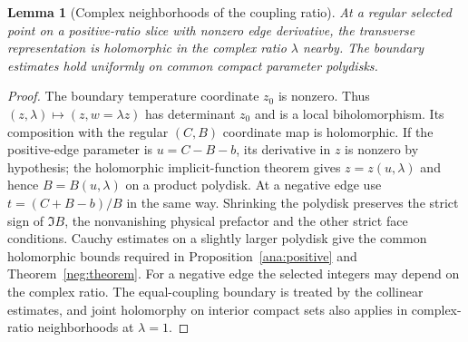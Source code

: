 \documentclass[11pt]{article}
\numberwithin{equation}{section}
\newtheorem{lemma}[theorem]{Lemma}
\theoremstyle{definition}
\begin{document}
\begin{lemma}[Complex neighborhoods of the coupling ratio]\label{main:complexratio}
At a regular selected point on a positive-ratio slice with nonzero
edge derivative, the transverse representation is holomorphic in
the complex ratio \(\lambda\) nearby. The boundary estimates hold
uniformly on common compact parameter polydisks.
\end{lemma}
\begin{proof}
The boundary temperature coordinate \(z_0\) is nonzero. Thus
\((z,\lambda)\mapsto(z,w=\lambda z)\) has determinant \(z_0\)
and is a local biholomorphism. Its composition with the regular
\((C,B)\) coordinate map is holomorphic. If the positive-edge
parameter is \(u=C-B-b\), its derivative in \(z\) is nonzero
by hypothesis; the holomorphic implicit-function theorem gives
\(z=z(u,\lambda)\) and hence \(B=B(u,\lambda)\) on a product
polydisk. At a negative edge use \(t=(C+B-b)/B\) in the same way.
Shrinking the polydisk preserves the strict sign of \(\Im B\),
the nonvanishing physical prefactor and the other strict face
conditions. Cauchy estimates on a slightly larger polydisk give
the common holomorphic bounds required in
Proposition~\ref{ana:positive} and Theorem~\ref{neg:theorem}.
For a negative edge the selected integers may depend on the complex
ratio. The equal-coupling boundary is treated by the collinear
estimates, and joint holomorphy on interior compact sets also applies
in complex-ratio neighborhoods at \(\lambda=1\).
\end{proof}
\end{document}
